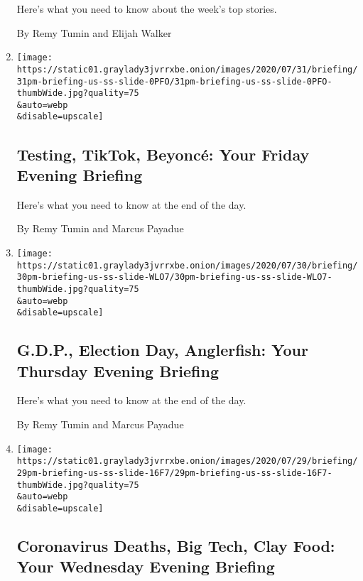 \begin{enumerate}
  Here's what you need to know about the week's top stories.

  By Remy Tumin and Elijah Walker
\item
  \href{/2020/07/31/briefing/testing-tiktok-beyonce.html}{}

  \texttt{[image: https://static01.graylady3jvrrxbe.onion/images/2020/07/31/briefing/31pm-briefing-us-ss-slide-0PFO/31pm-briefing-us-ss-slide-0PFO-thumbWide.jpg?quality=75\\\&auto=webp\\\&disable=upscale]}

  \hypertarget{testing-tiktok-beyoncuxe9-your-friday-evening-briefing}{%
  \subsection{Testing, TikTok, Beyoncé: Your Friday Evening
  Briefing}\label{testing-tiktok-beyoncuxe9-your-friday-evening-briefing}}

  Here's what you need to know at the end of the day.

  By Remy Tumin and Marcus Payadue
\item
  \href{/2020/07/30/briefing/gdp-election-day-anglerfish.html}{}

  \texttt{[image: https://static01.graylady3jvrrxbe.onion/images/2020/07/30/briefing/30pm-briefing-us-ss-slide-WLO7/30pm-briefing-us-ss-slide-WLO7-thumbWide.jpg?quality=75\\\&auto=webp\\\&disable=upscale]}

  \hypertarget{gdp-election-day-anglerfish-your-thursday-evening-briefing}{%
  \subsection{G.D.P., Election Day, Anglerfish: Your Thursday Evening
  Briefing}\label{gdp-election-day-anglerfish-your-thursday-evening-briefing}}

  Here's what you need to know at the end of the day.

  By Remy Tumin and Marcus Payadue
\item
  \href{/2020/07/29/briefing/coronavirus-deaths-big-tech-clay-food.html}{}

  \texttt{[image: https://static01.graylady3jvrrxbe.onion/images/2020/07/29/briefing/29pm-briefing-us-ss-slide-16F7/29pm-briefing-us-ss-slide-16F7-thumbWide.jpg?quality=75\\\&auto=webp\\\&disable=upscale]}

  \hypertarget{coronavirus-deaths-big-tech-clay-food-your-wednesday-evening-briefing}{%
  \subsection{Coronavirus Deaths, Big Tech, Clay Food: Your Wednesday
  Evening
  Briefing}\label{coronavirus-deaths-big-tech-clay-food-your-wednesday-evening-briefing}}


\end{enumerate}
